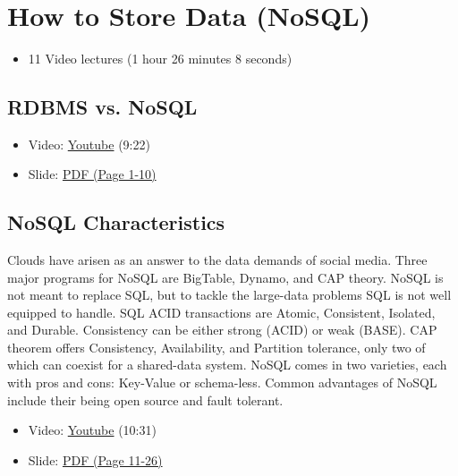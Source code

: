 \FILENAME\

\section{How to Store Data (NoSQL)}\label{how-to-store-data-nosql}


\begin{itemize}

\item
  11 Video lectures (1 hour 26 minutes 8 seconds)
\end{itemize}

\subsection{RDBMS vs. NoSQL}\label{rdbms-vs.-nosql}

\begin{itemize}

\item
  Video: \href{https://www.youtube.com/watch?v=dJunqER9lb8}{Youtube}
  (9:22)
\item
  Slide:
  \href{https://drive.google.com/open?id=0B88HKpainTSfaDFNbjNiMm44bnc}{PDF
  (Page 1-10)}
\end{itemize}

\subsection{NoSQL Characteristics}\label{nosql-characteristics}

Clouds have arisen as an answer to the data demands of social media.
Three major programs for NoSQL are BigTable, Dynamo, and CAP theory.
NoSQL is not meant to replace SQL, but to tackle the large-data problems
SQL is not well equipped to handle. SQL ACID transactions are Atomic,
Consistent, Isolated, and Durable. Consistency can be either strong
(ACID) or weak (BASE). CAP theorem offers Consistency, Availability, and
Partition tolerance, only two of which can coexist for a shared-data
system. NoSQL comes in two varieties, each with pros and cons: Key-Value
or schema-less. Common advantages of NoSQL include their being open
source and fault tolerant.

\begin{itemize}

\item
  Video: \href{https://www.youtube.com/watch?v=BjtTDiKhqk8}{Youtube}
  (10:31)
\item
  Slide:
  \href{https://drive.google.com/open?id=0B88HKpainTSfaDFNbjNiMm44bnc}{PDF
  (Page 11-26)}
\end{itemize}


